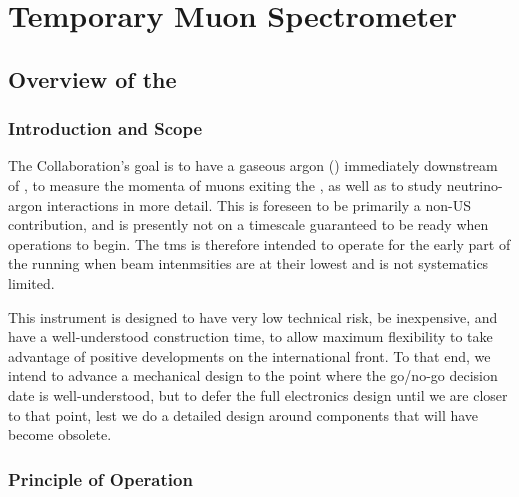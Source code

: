 \chapter{Temporary Muon Spectrometer}
\label{ch:tms}



\section{Overview of the }
\label{sec:tms-ovvw}

\subsection{Introduction and Scope}
\label{sec:tms-ovvw-intro}

The  Collaboration's goal is to have a gaseous argon  () immediately downstream of , to measure the momenta of muons exiting the , as well as to study neutrino-argon interactions in more detail. This is foreseen to be primarily a non-US contribution, and is presently not on a timescale guaranteed to be ready when  operations to begin. The {tms} is therefore intended to operate for the early part of the running when beam intenmsities are at their lowest and  is not systematics limited.

This instrument is designed to have very low technical risk, be inexpensive, and have a well-understood construction time, to allow maximum flexibility to take advantage of positive developments on the international front. To that end, we intend to advance a mechanical design to the point where the go/no-go decision date is well-understood, but to defer the full electronics design until we are closer to that point, lest we do a detailed design around components that will have become obsolete.

\subsection{Principle of Operation}
\label{sec:tms-ovvw-op}

